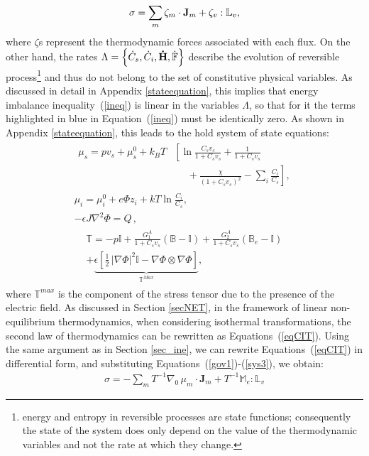 \begin{equation}
\sigma = \sum_m \zeta_m \cdot \mathbf{J}_m + \zeta_v : \mathbb{L}_v,
\label{dis}
\end{equation}
where $\zeta$s represent the thermodynamic forces associated with each flux. On the other hand, the rates $\Lambda =\left\{\dot{C}_s,\dot{C}_i,\mathbf{\dot{H}},\dot{\mathbb{F}}\right\}$ describe the evolution of reversible process\footnote{energy and entropy in reversible processes are state functions; consequently the state of the system does only depend on the value of the thermodynamic variables and not the rate at which they change.} and thus do not belong to the set of constitutive physical variables. As discussed in detail in Appendix \ref{stateequation}, this implies that energy imbalance inequality~(\ref{ineq}) is linear in the variables $\Lambda$, so that for it the terms highlighted in blue in Equation~(\ref{ineq}) must be identically zero. As shown in Appendix \ref{stateequation}, this leads to the hold system of state equations:
\begin{gather}
\begin{aligned}
\mu_s = p v_s + \mu_s^0 + k_BT&\left[\ln \frac{C_s v_s}{1+C_s v_s} + \frac{1}{1+C_sv_s}\right.\\
&\left.\ \ \ \ \ \ +\frac{\chi}{(1+C_s v_s)^2}-\sum_i \frac{C_i}{C_s}\right], 
\end{aligned}\label{gov1}\\[2.5mm]
\mu_i = \mu^0_i + e\Phi z_i + kT \ln \frac{C_i}{C_s},\label{mu}\\
-\epsilon J \nabla^2 \Phi = Q\, ,\label{sys2}
\end{gather}
\begin{gather}
\begin{aligned}
\mathbb{T}= -p \mathbb{I}+ \frac{G^A_1}{1+C_sv_s}\left(\mathbb{B}-\mathbb{I}\right) + \frac{G^A_2}{1+C_sv_s}\left(\mathbb{B}_e-\mathbb{I}\right) \\
+ \underbrace{\epsilon \left[\frac{1}{2} \,|\nabla \Phi|^2\mathbb{I} -\nabla \Phi \otimes \nabla \Phi\right]}_{\mathbb{T}^{Max}},
\end{aligned}
\label{sys3}
\end{gather}
where $\mathbb{T}^{max}$ is the component of the stress tensor due to the presence of the electric field. As discussed in Section \ref{secNET}, in the framework of linear non-equilibrium thermodynamics, when considering isothermal transformations, the second law of thermodynamics can be rewritten as Equations~(\ref{eqCIT}). Using the same argument as in Section \ref{sec_ine}, we can rewrite Equations~(\ref{eqCIT}) in differential form, and substituting Equations~(\ref{gov1})-(\ref{sys3}), we obtain:
\begin{equation}
\begin{aligned}
\sigma = -  \sum_m T^{-1} \nabla_0 \,\mu_m \cdot \mathbf{J}_m + T^{-1}\mathbb{M}_e:\mathbb{L}_v\label{EQen}
\end{aligned} 
\end{equation}


